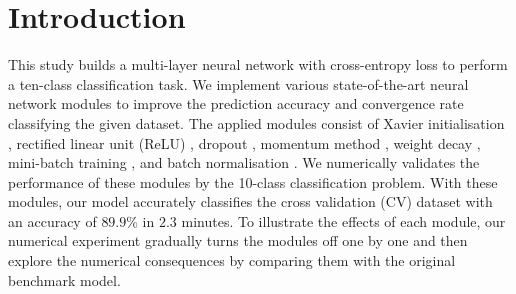 \section{Introduction\label{chapter1}}

This study builds a multi-layer neural network with cross-entropy loss to perform a ten-class classification task. We implement various state-of-the-art neural network modules to improve the prediction accuracy  and convergence rate classifying the given dataset.
The applied modules consist of Xavier initialisation \citep{pmlr-v9-glorot10a}, 
rectified linear unit (ReLU) \citep{relu-hahnloser}, 
dropout \citep{DBLP:journals/corr/abs-1207-0580},
momentum method \citep{rumelhart1986learning},
weight decay \citep{NIPS1991563}, 
mini-batch training \citep{DBLP:journals/corr/GoyalDGNWKTJH17}, 
and batch normalisation \citep{pmlr-v37-ioffe15}.
We numerically validates the performance of these modules by the 10-class classification problem. 
With these modules, our model accurately classifies the cross validation (CV) dataset with an accuracy of $89.9\%$ in $2.3$ minutes. 
To illustrate the effects of each module, our numerical experiment gradually turns the modules off one by one and then explore the numerical consequences by comparing them with the original benchmark model.

